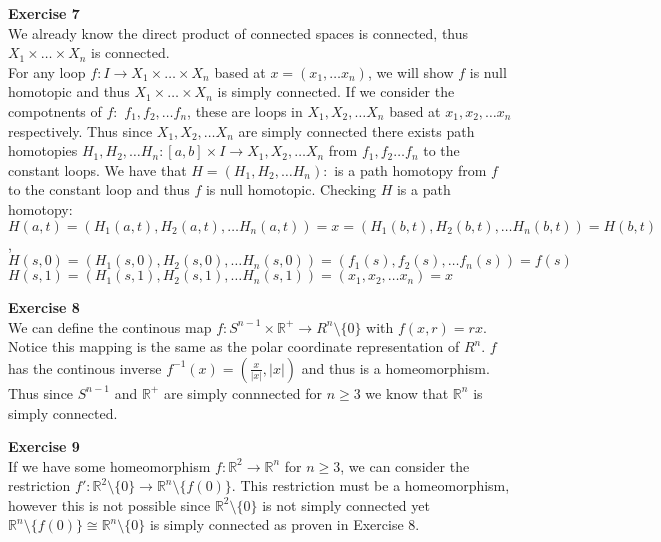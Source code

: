 \documentclass[12pt]{article}
\newenvironment{ques}[1]{\textbf{Exercise #1}\vspace{1 mm}\\ }{\bigskip}
\theoremstyle{definition}
\newcommand{\R}{\mathbb R}
\renewcommand{\b}{\setminus}
\begin{document}
\begin{ques}{7}
	We already know the direct product of connected spaces is connected, thus
	$X_1 \times \dots \times X_n$ is connected.\\
	For any loop $f: I \to X_1 \times \dots \times X_n$ based at $x = (x_1,
	\dots x_n)$, we will show $f$ is null homotopic and thus $X_1 \times \dots
	\times X_n$ is simply connected. If we consider the compotnents of $f:$
	$f_1, f_2, \dots f_n$, these are loops in $X_1, X_2, \dots X_n$ based at
	$x_1, x_2, \dots x_n$ respectively. Thus since $X_1, X_2, \dots X_n$ are
	simply connected there exists path homotopies $H_1, H_2, \dots H_n : [a,b]
	\times I \to X_1, X_2, \dots X_n$ from $f_1,f_2 \dots f_n$ to the constant
	loops. We have that $H = (H_1, H_2, \dots H_n): $ is a path homotopy from
	$f$ to the constant loop and thus $f$ is null homotopic. Checking $H$ is a
	path homotopy:\\
	$H(a,t) = (H_1(a,t), H_2(a,t), \dots H_n(a,t)) = x = (H_1(b,t), H_2(b,t),
	\dots H_n(b,t)) = H(b,t)$,\\
	$H(s, 0) = (H_1(s,0), H_2(s,0), \dots H_n(s,0)) = (f_1(s),f_2(s), \dots
	f_n(s)) = f(s)$\\
	$H(s, 1) = (H_1(s,1), H_2(s,1), \dots H_n(s,1)) = (x_1,x_2, \dots
	x_n) = x$\\

\end{ques}

\begin{ques}{8}
	We can define the continous map $f:S^{n-1} \times \R^+ \to R^n \b \{0\}$
	with $f(x,r) = rx$. Notice this mapping is the same as the polar coordinate
	representation of $R^n$. $f$ has the continous inverse $f^{-1}(x) =
	(\frac{x}{|x|}, |x|)$ and thus is a homeomorphism. Thus since $S^{n-1}$ and
	$\R^+$ are simply connnected for $n \geq 3$ we know that $\R^n$ is simply
	connected.
\end{ques}

\begin{ques}{9}
	If we have some homeomorphism $f:\R^2 \to \R^n$ for $n \geq 3$, we can
	consider the restriction $f':\R^2\b \{0\} \to \R^n\b \{f(0)\}$. This
	restriction must be a homeomorphism, however this is not possible since
	$\R^2 \b \{0\}$ is not simply connected yet $\R^n \b \{f(0)\} \cong \R^n \b
	\{0\}$ is simply connected as proven in Exercise 8. 
\end{ques}
\end{document}
